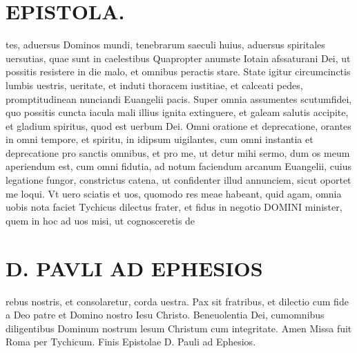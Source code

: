 \documentclass{article}
\begin{document}
\begin{pages}
\section*{EPISTOLA.  }
\marginpar{[ p.10.  ]}
\marginpar{[ p.]}
\marginpar{[ p.]}
\marginpar{[ p.]}\pstart tes, aduersus Dominos mundi, tenebrarum saeculi huius, aduersus spiritales uersutias, quae sunt in caelestibus  \pend\pstart Quapropter anumste Iotain afssaturani Dei, ut possitis resistere in die malo, et omnibus peractis stare. State igitur circumcinctis lumbis uestris, ueritate, et induti thoracem iustitiae, et calceati pedes, promptitudinean nunciandi Euangelii pacis. Super omnia assumentes scutumfidei, quo possitis cuncta iacula mali illius ignita extinguere, et galeam salutis accipite, et gladium spiritus, quod est uerbum Dei.  \pend\pstart Omni oratione et deprecatione, orantes in omni tempore, et spiritu, in idipsum uigilantes, cum omni instantia et deprecatione pro sanctis omnibus, et pro me, ut detur mihi sermo, dum os meum aperiendum est, cum omni fidutia, ad notum faciendum arcanum Euangelii, cuius legatione fungor, constrictus catena, ut confidenter illud annunciem, sicut oportet me loqui.  \pend\pstart Vt uero sciatis et uos, quomodo res meae habeant, quid agam, omnia uobis nota faciet Tychicus dilectus frater, et fidus in negotio DOMINI minister, quem in hoc ad uos misi, ut cognosceretis de  \pend
\section*{D. PAVLI AD EPHESIOS }
\marginpar{[ p.9.  ]}\pstart rebus nostris, et consolaretur, corda uestra.  Pax sit fratribus, et dilectio cum fide a Deo patre et Domino nostro Iesu Christo. Beneuolentia Dei, cumomnibus diligentibus Dominum nostrum lesum Christum cum integritate. Amen Missa fuit Roma per Tychicum. Finis Epistolae D. Pauli ad Ephesios.  \pend

\end{pages}
\end{document}
